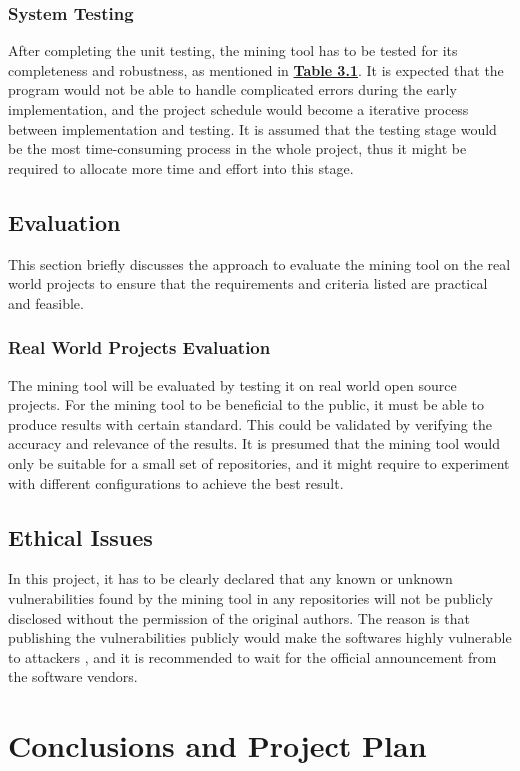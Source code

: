 \documentclass[12pt, a4paper]{report}
\begin{document}
{\subsection{System Testing}
After completing the unit testing, the mining tool has to be tested for its completeness and
robustness, as mentioned in \hyperref[table:criteria]{\textbf{Table 3.1}}. It is expected that the
program would not be able to handle complicated errors during the early implementation, and the
project schedule would become a iterative process between implementation and testing. It is assumed
that the testing stage would be the most time-consuming process in the whole project, thus it might
be required to allocate more time and effort into this stage.

\section{Evaluation}
This section briefly discusses the approach to evaluate the mining tool on the real world projects
to ensure that the requirements and criteria listed are practical and feasible.

\subsection{Real World Projects Evaluation}
The mining tool will be evaluated by testing it on real world open source projects. For the mining
tool to be beneficial to the public, it must be able to produce results with certain standard. This
could be validated by verifying the accuracy and relevance of the results. It is presumed that the
mining tool would only be suitable for a small set of repositories, and it might require to
experiment with different configurations to achieve the best result.

\section{Ethical Issues}
In this project, it has to be clearly declared that any known or unknown vulnerabilities found by
the mining tool in any repositories will not be publicly disclosed without the permission of the
original authors. The reason is that publishing the vulnerabilities publicly would make the
softwares highly vulnerable to attackers \cite{arora_2010}, and it is recommended to wait for the
official announcement from the software vendors.

\chapter*{Conclusions and Project Plan}
}
\end{document}
